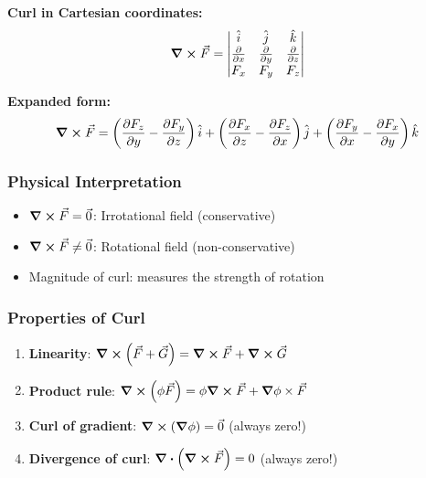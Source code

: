 \documentclass[12pt,a4paper]{article}
\begin{document}
\begin{formulabox}
\textbf{Curl in Cartesian coordinates:}
\begin{equation}
\curl \vec{F} = \begin{vmatrix}
\hat{i} & \hat{j} & \hat{k} \\
\pdv{}{x} & \pdv{}{y} & \pdv{}{z} \\
F_x & F_y & F_z
\end{vmatrix}
\end{equation}

\textbf{Expanded form:}
\begin{equation}
\curl \vec{F} = \left(\pdv{F_z}{y} - \pdv{F_y}{z}\right)\hat{i} + \left(\pdv{F_x}{z} - \pdv{F_z}{x}\right)\hat{j} + \left(\pdv{F_y}{x} - \pdv{F_x}{y}\right)\hat{k}
\end{equation}
\end{formulabox}

\subsubsection{Physical Interpretation}
\begin{itemize}
    \item $\curl \vec{F} = \vec{0}$: Irrotational field (conservative)
    \item $\curl \vec{F} \neq \vec{0}$: Rotational field (non-conservative)
    \item Magnitude of curl: measures the strength of rotation
\end{itemize}

\subsubsection{Properties of Curl}
\begin{enumerate}
    \item \textbf{Linearity}: $\curl(\vec{F} + \vec{G}) = \curl\vec{F} + \curl\vec{G}$
    \item \textbf{Product rule}: $\curl(\phi\vec{F}) = \phi\curl\vec{F} + \grad\phi \times \vec{F}$
    \item \textbf{Curl of gradient}: $\curl(\grad\phi) = \vec{0}$ (always zero!)
    \item \textbf{Divergence of curl}: $\div(\curl\vec{F}) = 0$ (always zero!)
\end{enumerate}
\end{document}
